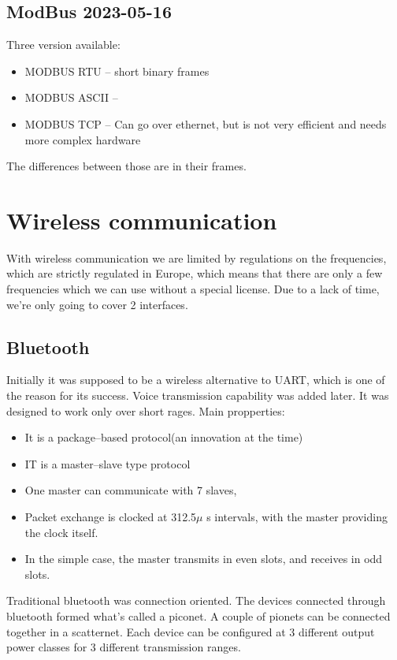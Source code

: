 \section{ModBus 2023-05-16}
Three version available:
\begin{itemize}
        \item MODBUS RTU -- short binary frames
        \item MODBUS ASCII --
        \item MODBUS TCP -- Can go over ethernet, but is not very efficient and needs more complex hardware
\end{itemize}
The differences between those are in their frames.

\chapter{Wireless communication}

With wireless communication we are limited by regulations on the frequencies, which are strictly regulated in Europe, which means that there 
are only a few frequencies which we can use without a special license.
Due to a lack of time, we're only going to cover 2 interfaces.
\section{Bluetooth}
Initially it was supposed to be a wireless alternative to UART, which is one of the reason for its success.
Voice transmission capability was added later. It was designed to work only over short rages.
Main propperties:
\begin{itemize}
        \item It is a package--based protocol(an innovation at the time)
        \item IT is a master--slave type protocol
        \item One master can communicate with 7 slaves,
        \item Packet exchange is clocked at 312.5$\mu$ s intervals, with the master providing the clock itself.
        \item In the simple case, the master transmits in even slots, and receives in odd slots.
        
\end{itemize}
Traditional bluetooth was connection oriented. The devices connected through bluetooth formed what's called a piconet.
A couple of pionets can be connected together in a scatternet. Each device can be configured at 3 different output 
power classes for 3 different transmission ranges.
